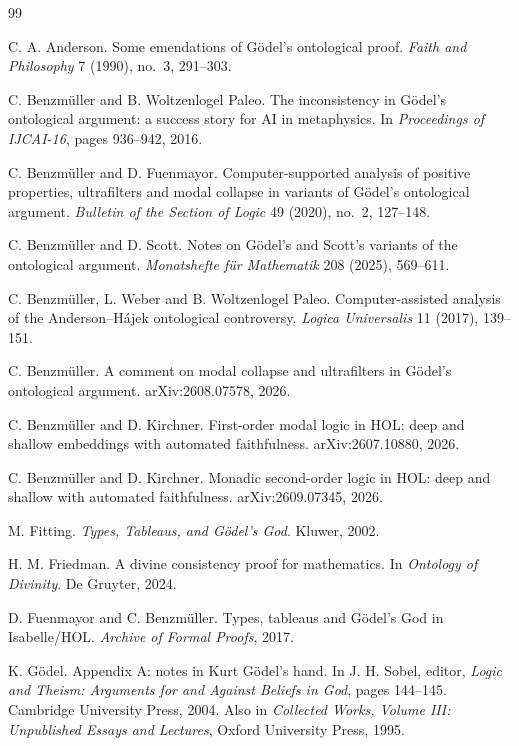 \documentclass[11pt]{article}
\theoremstyle{plain}
\theoremstyle{definition}
\begin{document}
\begin{thebibliography}{99}

C. A. Anderson.
\newblock Some emendations of G\"odel's ontological proof.
\newblock \emph{Faith and Philosophy} 7 (1990), no.~3, 291--303.

C. Benzm\"uller and B. Woltzenlogel Paleo.
\newblock The inconsistency in G\"odel's ontological argument: a success story
  for AI in metaphysics.
\newblock In \emph{Proceedings of IJCAI-16}, pages 936--942, 2016.

C. Benzm\"uller and D. Fuenmayor.
\newblock Computer-supported analysis of positive properties, ultrafilters and
  modal collapse in variants of G\"odel's ontological argument.
\newblock \emph{Bulletin of the Section of Logic} 49 (2020), no.~2, 127--148.

C. Benzm\"uller and D. Scott.
\newblock Notes on G\"odel's and Scott's variants of the ontological argument.
\newblock \emph{Monatshefte f\"ur Mathematik} 208 (2025), 569--611.

C. Benzm\"uller, L. Weber and B. Woltzenlogel Paleo.
\newblock Computer-assisted analysis of the Anderson--H\'ajek ontological
  controversy.
\newblock \emph{Logica Universalis} 11 (2017), 139--151.

C. Benzm\"uller.
\newblock A comment on modal collapse and ultrafilters in G\"odel's ontological
  argument.
\newblock arXiv:2608.07578, 2026.

C. Benzm\"uller and D. Kirchner.
\newblock First-order modal logic in HOL: deep and shallow embeddings with
  automated faithfulness.
\newblock arXiv:2607.10880, 2026.

C. Benzm\"uller and D. Kirchner.
\newblock Monadic second-order logic in HOL: deep and shallow with automated
  faithfulness.
\newblock arXiv:2609.07345, 2026.

M. Fitting.
\newblock \emph{Types, Tableaus, and G\"odel's God}.
\newblock Kluwer, 2002.

H. M. Friedman.
\newblock A divine consistency proof for mathematics.
\newblock In \emph{Ontology of Divinity}. De Gruyter, 2024.

D. Fuenmayor and C. Benzm\"uller.
\newblock Types, tableaus and G\"odel's God in Isabelle/HOL.
\newblock \emph{Archive of Formal Proofs}, 2017.

K. G\"odel.
\newblock Appendix A: notes in Kurt G\"odel's hand.
\newblock In J. H. Sobel, editor, \emph{Logic and Theism: Arguments for and
  Against Beliefs in God}, pages 144--145. Cambridge University Press, 2004.
\newblock Also in \emph{Collected Works, Volume III: Unpublished Essays and
  Lectures}, Oxford University Press, 1995.


\end{thebibliography}
\end{document}
